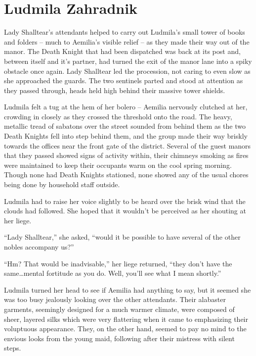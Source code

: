 \chapter{Ludmila Zahradnik}

Lady Shalltear’s attendants helped to carry out Ludmila’s small tower of books and folders – much to Aemilia’s visible relief – as they made their way out of the manor. The Death Knight that had been dispatched was back at its post and, between itself and it’s partner, had turned the exit of the manor lane into a spiky obstacle once again. Lady Shalltear led the procession, not caring to even slow as she approached the guards. The two sentinels parted and stood at attention as they passed through, heads held high behind their massive tower shields.

 

Ludmila felt a tug at the hem of her bolero – Aemilia nervously clutched at her, crowding in closely as they crossed the threshold onto the road. The heavy, metallic tread of sabatons over the street sounded from behind them as the two Death Knights fell into step behind them, and the group made their way briskly towards the offices near the front gate of the district. Several of the guest manors that they passed showed signs of activity within, their chimneys smoking as fires were maintained to keep their occupants warm on the cool spring morning. Though none had Death Knights stationed, none showed any of the usual chores being done by household staff outside.

 

Ludmila had to raise her voice slightly to be heard over the brisk wind that the clouds had followed. She hoped that it wouldn’t be perceived as her shouting at her liege.

 

“Lady Shalltear,” she asked, “would it be possible to have several of the other nobles accompany us?”

 

“Hm? That would be inadvisable,” her liege returned, “they don’t have the same…mental fortitude as you do. Well, you’ll see what I mean shortly.”

 

Ludmila turned her head to see if Aemilia had anything to say, but it seemed she was too busy jealously looking over the other attendants. Their alabaster garments, seemingly designed for a much warmer climate, were composed of sheer, layered silks which were very flattering when it came to emphasizing their voluptuous appearance. They, on the other hand, seemed to pay no mind to the envious looks from the young maid, following after their mistress with silent steps.

